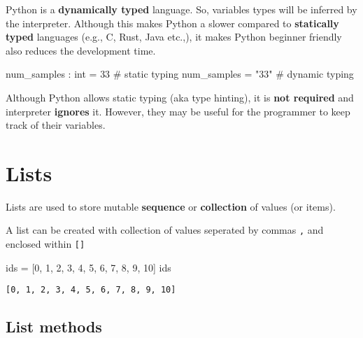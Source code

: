 \documentclass[
  letterpaper,
  DIV=11,
  numbers=noendperiod]{scrreprt}
\newenvironment{Shaded}{\begin{snugshade}}{\end{snugshade}}
\newcommand{\BuiltInTok}[1]{\textcolor[rgb]{0.00,0.23,0.31}{#1}}
\newcommand{\CommentTok}[1]{\textcolor[rgb]{0.37,0.37,0.37}{#1}}
\newcommand{\DecValTok}[1]{\textcolor[rgb]{0.68,0.00,0.00}{#1}}
\newcommand{\NormalTok}[1]{\textcolor[rgb]{0.00,0.23,0.31}{#1}}
\newcommand{\OperatorTok}[1]{\textcolor[rgb]{0.37,0.37,0.37}{#1}}
\newcommand{\StringTok}[1]{\textcolor[rgb]{0.13,0.47,0.30}{#1}}
\begin{document}
Python is a \textbf{dynamically typed} language. So, variables types
will be inferred by the interpreter. Although this makes Python a slower
compared to \textbf{statically typed} languages (e.g., C, Rust, Java
etc.,), it makes Python beginner friendly also reduces the development
time.

\begin{Shaded}
\begin{Highlighting}[]
\NormalTok{num\_samples : }\BuiltInTok{int} \OperatorTok{=} \DecValTok{33} \CommentTok{\# static typing}
\NormalTok{num\_samples }\OperatorTok{=} \StringTok{"33"} \CommentTok{\# dynamic typing}
\end{Highlighting}
\end{Shaded}

Although Python allows static typing (aka type hinting), it is
\textbf{not required} and interpreter \textbf{ignores} it. However, they
may be useful for the programmer to keep track of their variables.

\chapter{Lists}\label{lists}

Lists are used to store mutable \textbf{sequence} or \textbf{collection}
of values (or items).

A list can be created with collection of values seperated by commas
\texttt{,} and enclosed within \texttt{{[}{]}}

\begin{Shaded}
\begin{Highlighting}[]
\NormalTok{ids }\OperatorTok{=}\NormalTok{ [}\DecValTok{0}\NormalTok{, }\DecValTok{1}\NormalTok{, }\DecValTok{2}\NormalTok{, }\DecValTok{3}\NormalTok{, }\DecValTok{4}\NormalTok{, }\DecValTok{5}\NormalTok{, }\DecValTok{6}\NormalTok{, }\DecValTok{7}\NormalTok{, }\DecValTok{8}\NormalTok{, }\DecValTok{9}\NormalTok{, }\DecValTok{10}\NormalTok{]}
\NormalTok{ids}
\end{Highlighting}
\end{Shaded}

\begin{verbatim}
[0, 1, 2, 3, 4, 5, 6, 7, 8, 9, 10]
\end{verbatim}

\section{List methods}\label{list-methods}
\end{document}
